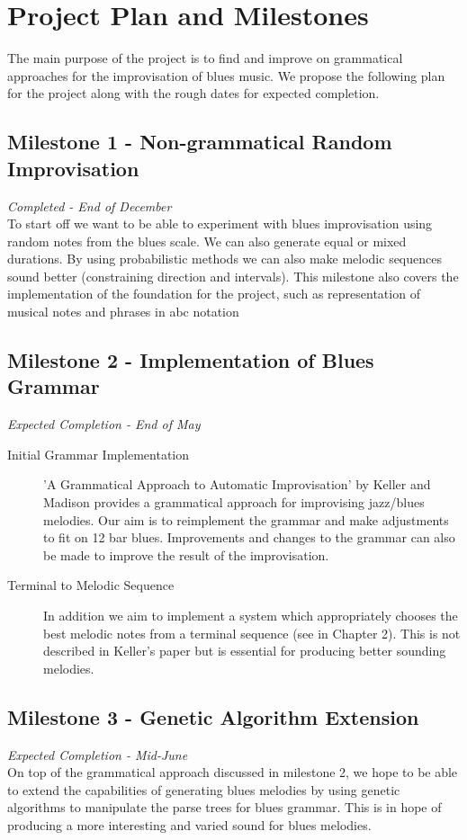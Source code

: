\documentclass[pdftex,12pt,a4paper]{report}
\begin{document}
\section{Project Plan and Milestones}

The main purpose of the project is to find and improve on grammatical approaches for the improvisation of blues music. We propose the following plan for the project along with the rough dates for expected completion. 

\subsection{Milestone 1 - Non-grammatical Random Improvisation}
\emph{Completed - End of December} \\
To start off we want to be able to experiment with blues improvisation using random notes from the blues scale. We can also generate equal or mixed durations. By using probabilistic methods we can also make melodic sequences sound better (constraining direction and intervals). This milestone also covers the implementation of the foundation for the project, such as representation of musical notes and phrases in abc notation

\subsection{Milestone 2 - Implementation of Blues Grammar}
\emph{Expected Completion - End of May} 
\begin{description}
\item[Initial Grammar Implementation]
'A Grammatical Approach to Automatic Improvisation' by Keller and Madison \cite{keller07} provides a grammatical approach for improvising jazz/blues melodies. Our aim is to reimplement the grammar and make adjustments to fit on 12 bar blues. Improvements and changes to the grammar can also be made to improve the result of the improvisation. 
\item[Terminal to Melodic Sequence]
In addition we aim to implement a system which appropriately chooses the best melodic notes from a terminal sequence (see in Chapter 2). This is not described in Keller's paper but is essential for producing better sounding melodies.
\end{description}

\subsection{Milestone 3 - Genetic Algorithm Extension}
\emph{Expected Completion - Mid-June} \\
On top of the grammatical approach discussed in milestone 2, we hope to be able to extend the capabilities of generating blues melodies by using genetic algorithms to manipulate the parse trees for blues grammar. This is in hope of producing a more interesting and varied sound for blues melodies.
\end{document}
